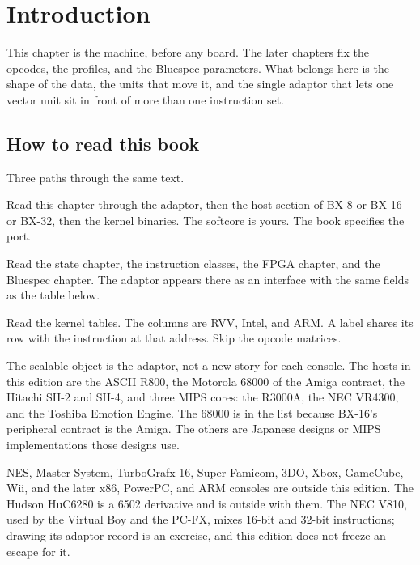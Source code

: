 \chapter{Introduction}
\label{ch:intro}

This chapter is the machine, before any board. The later chapters fix the opcodes, the profiles, and the Bluespec parameters. What belongs here is the shape of the data, the units that move it, and the single adaptor that lets one vector unit sit in front of more than one instruction set.

\section{How to read this book}

Three paths through the same text.

\begin{description}[leftmargin=1.5em,style=nextline]
  \item[Retro board.] Read this chapter through the adaptor, then the host section of BX-8 or BX-16 or BX-32, then the kernel binaries. The softcore is yours. The book specifies the port.
  \item[Register transfer.] Read the state chapter, the instruction classes, the FPGA chapter, and the Bluespec chapter. The adaptor appears there as an interface with the same fields as the table below.
  \item[Comparison.] Read the kernel tables. The columns are RVV, Intel, and ARM. A label shares its row with the instruction at that address. Skip the opcode matrices.
\end{description}

The scalable object is the adaptor, not a new story for each console. The hosts in this edition are the ASCII R800, the Motorola 68000 of the Amiga contract, the Hitachi SH-2 and SH-4, and three MIPS cores: the R3000A, the NEC VR4300, and the Toshiba Emotion Engine. The 68000 is in the list because BX-16's peripheral contract is the Amiga. The others are Japanese designs or MIPS implementations those designs use.

NES, Master System, TurboGrafx-16, Super Famicom, 3DO, Xbox, GameCube, Wii, and the later x86, PowerPC, and ARM consoles are outside this edition. The Hudson HuC6280 is a 6502 derivative and is outside with them. The NEC V810, used by the Virtual Boy and the PC-FX, mixes 16-bit and 32-bit instructions; drawing its adaptor record is an exercise, and this edition does not freeze an escape for it.

